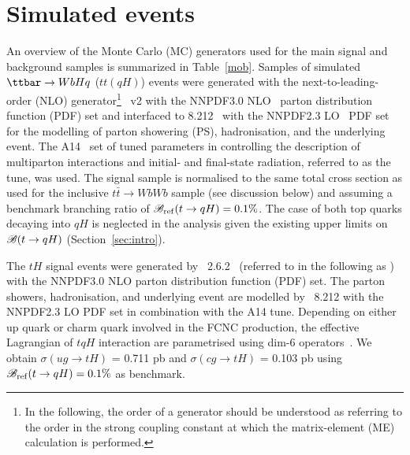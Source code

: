 \documentclass[PAPER, coverpage, atlasdraft=true, texlive=2016, UKenglish]{\ATLASLATEXPATH atlasdoc} %
\begin{document}
%
\section{Simulated events}
\label{sec:simulations}

An overview of the Monte Carlo (MC) generators used for the main signal and background samples is summarized in Table~\ref{mob}.
Samples of simulated $\ttbar \to WbHq$ ($tt(qH)$) events were generated with the next-to-leading-order (NLO) generator\footnote{In the following, 
the order of a generator should be understood as referring to the order in the strong coupling constant at which the matrix-element (ME) calculation 
is performed.} {\powheg}~v2 \cite{Frixione:2007nw,Nason:2004rx,Frixione:2007vw,Alioli:2010xd}
with the NNPDF3.0 NLO~\cite{Ball:2014uwa} parton distribution function (PDF) set and interfaced to {\pythia} 8.212~\cite{Sjostrand:2007gs} with the NNPDF2.3 LO~\cite{Ball:2012cx} PDF set for the modelling of parton showering (PS), hadronisation, and the underlying event. 
The A14~\cite{ATLASUETune4} set of tuned parameters in {\pythia} controlling the description of multiparton interactions and  
initial- and final-state radiation, referred to as the tune, was used.
The signal sample is normalised to the same total cross section as used for the inclusive $t\bar{t}\to WbWb$ sample (see discussion below) and
assuming a benchmark branching ratio of $\mathscr{B}_{\mathrm{ref}}(t\to qH)=0.1\%$.
The case of both top quarks decaying into $qH$ is neglected in the analysis given the existing upper limits on $\mathscr{B}(t \to qH)$ (Section~\ref{sec:intro}).

The $tH$ signal events were generated by {\amcatnlolong}~2.6.2~\cite{Alwall:2014hca}  (referred to in the following as {\amcatnlo})
with the NNPDF3.0 NLO parton distribution function (PDF) set. The parton showers, hadronisation, and underlying event are modelled by {\pythia}~8.212 with the NNPDF2.3 LO PDF set
in combination with the A14 tune.
Depending on either up quark or charm quark involved in the FCNC production, the effective Lagrangian of $tqH$ interaction are parametrised using
dim-6 operators~\cite{fcnc_production_theory}. We obtain $\sigma(ug\to tH)$ = 0.711 pb and $\sigma(cg\to tH)$ = 0.103 pb using $\mathscr{B}_{\mathrm{ref}}(t\to qH)=0.1\%$ as benchmark.   
\end{document}
